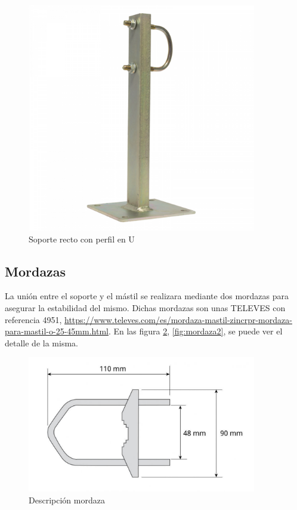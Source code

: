 \documentclass[letterpaper, 10pt]{article} %
\begin{document}
\begin{figure}[h!]
	\centering
	\includegraphics[width=10cm]{img/soporte_pared2.pdf}
	\caption{Soporte recto con perfil en U}
	\label{fig:soporte_pared2}
\end{figure}

\subsection{Mordazas}
La unión entre el soporte y el mástil se realizara mediante dos mordazas para asegurar la estabilidad del mismo. Dichas mordazas son unas TELEVES con referencia 4951, \url{https://www.televes.com/es/mordaza-mastil-zincrpr-mordaza-para-mastil-o-25-45mm.html}. En las figura \ref{fig:mordaza1}, \ref{fig:mordaza2}, se puede ver el detalle de la misma.

\begin{figure}[h!]
	\centering
	\includegraphics[width=10cm]{img/mordaza1.pdf}
	\caption{Descripción mordaza}
	\label{fig:mordaza1}
\end{figure}
\end{document}
